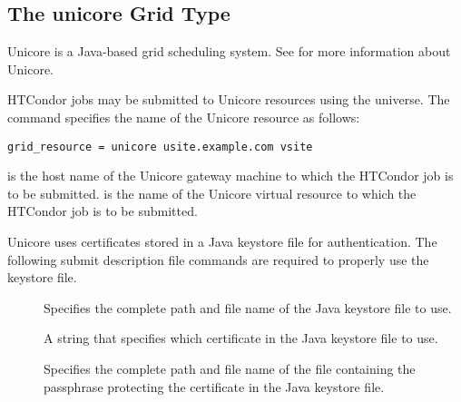 
\subsection{\label{sec:Unicore}The unicore Grid Type }

Unicore is a Java-based grid scheduling system.
See  for more information about Unicore.

HTCondor jobs may be submitted to
Unicore resources using the  universe.
The  command specifies the name of the
Unicore resource as follows:
\begin{verbatim}
grid_resource = unicore usite.example.com vsite
\end{verbatim}
 is the host name of the Unicore gateway
machine to which the HTCondor job is to be submitted.
 is the name of the Unicore virtual resource to which
the HTCondor job is to be submitted.

Unicore uses certificates stored in a Java keystore file for
authentication. 
The following submit description file commands
are required to properly use the keystore file.

\begin{description}
\item[] 
  Specifies the complete path and file name of the Java keystore file to use. 
\item[] 
  A string that specifies which certificate in the
  Java keystore file to use. 
\item[]
  Specifies the complete path and file name of the 
  file containing the passphrase protecting the certificate in the  
  Java keystore file.
\end{description}
